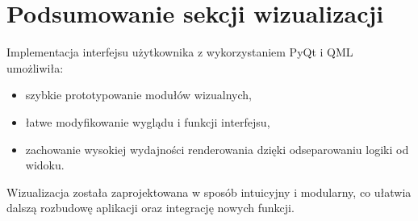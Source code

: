\section{Podsumowanie sekcji wizualizacji}

Implementacja interfejsu użytkownika z wykorzystaniem PyQt i QML umożliwiła:
\begin{itemize}
    \item szybkie prototypowanie modułów wizualnych,
    \item łatwe modyfikowanie wyglądu i funkcji interfejsu,
    \item zachowanie wysokiej wydajności renderowania dzięki odseparowaniu logiki od widoku.
\end{itemize}

Wizualizacja została zaprojektowana w sposób intuicyjny i modularny, co ułatwia dalszą rozbudowę aplikacji oraz integrację nowych funkcji.
